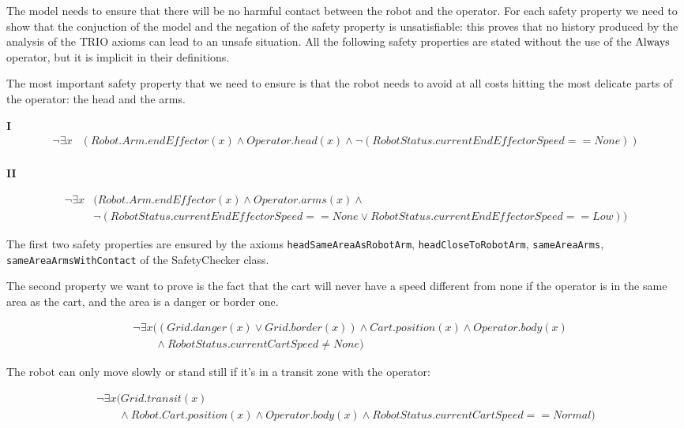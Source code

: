 The model needs to ensure that there will be no harmful contact between the robot and the operator. For each safety property we need to show that the conjuction of the model and the negation of the safety property is unsatisfiable: this proves that no history produced by the analysis of the TRIO axioms can lead to an unsafe situation. All the following safety properties are stated without the use of the $\operatorname{Always}$ operator, but it is implicit in their definitions.

The most important safety property that we need to ensure is that the robot needs to avoid at all costs hitting the most delicate parts of the operator: the head and the arms.

\textbf{I}
\begin{align*}
\neg \exists x &(Robot.Arm.endEffector(x) \land Operator.head(x) \land \neg (RobotStatus.currentEndEffectorSpeed == None)) \\ 
\end{align*}

\textbf{II}

\begin{align*}
\neg \exists x &(Robot.Arm.endEffector(x) \land Operator.arms(x) \land \\
&\neg (RobotStatus.currentEndEffectorSpeed == None \lor RobotStatus.currentEndEffectorSpeed == Low))
\end{align*}

The first two safety properties are ensured by the axioms \texttt{headSameAreaAsRobotArm}, \texttt{headCloseToRobotArm}, \texttt{sameAreaArms}, \texttt{sameAreaArmsWithContact} of the SafetyChecker class.


The second property we want to prove is the fact that the cart will never have a speed different from none if the operator is in the same area as the cart, and the area is a danger or border one.

\begin{align*}
  &\neg \exists x ((Grid.danger(x) \lor Grid.border(x)) \land Cart.position(x) \land Operator.body(x) \\
  &\qquad \land RobotStatus.currentCartSpeed \neq None)
\end{align*}

The robot can only move slowly or stand still if it's in a transit zone with the operator:

\begin{equation*}
  \begin{array}{l}
  \neg \exists x (Grid.transit(x) \\
  \qquad \land Robot.Cart.position(x) \land Operator.body(x) \land RobotStatus.currentCartSpeed == Normal)
  \end{array}
\end{equation*}

